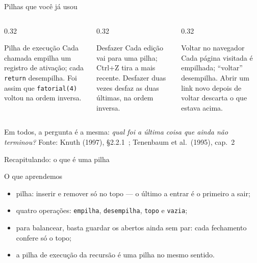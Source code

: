 \documentclass[aspectratio=169]{beamer}
\newcommand{\fonte}[1]{\vfill\hfill{\scriptsize\textcolor{UFSGray}{Fonte: #1}}}
\begin{document}
\begin{frame}{Pilhas que você já usou}
  \begin{columns}[T]
    \begin{column}{0.32\textwidth}
      \begin{block}{Pilha de execução}
        \small Cada chamada empilha um registro de ativação; cada
        \texttt{return} desempilha. Foi assim que \texttt{fatorial(4)}
        voltou na ordem inversa.
      \end{block}
    \end{column}
    \begin{column}{0.32\textwidth}
      \begin{block}{Desfazer}
        \small Cada edição vai para uma pilha; \textsf{Ctrl+Z} tira a mais
        recente. Desfazer duas vezes desfaz as duas últimas, na ordem
        inversa.
      \end{block}
    \end{column}
    \begin{column}{0.32\textwidth}
      \begin{block}{Voltar no navegador}
        \small Cada página visitada é empilhada; ``voltar'' desempilha.
        Abrir um link novo depois de voltar descarta o que estava acima.
      \end{block}
    \end{column}
  \end{columns}
  \medskip
  \small Em todos, a pergunta é a mesma: \emph{qual foi a última coisa que
  ainda não terminou?}
  \fonte{Knuth (1997), §2.2.1~\cite{knuth1997art};
    Tenenbaum et al.\ (1995), cap.~2~\cite{tenenbaum1995estruturas}}
\end{frame}

\begin{frame}{Recapitulando: o que é uma pilha}
  \begin{block}{O que aprendemos}
    \begin{itemize}
      \item pilha: inserir e remover só no topo --- o último a entrar é o
        primeiro a sair;
      \item quatro operações: \texttt{empilha}, \texttt{desempilha},
        \texttt{topo} e \texttt{vazia};
      \item para balancear, basta guardar os abertos ainda sem par: cada
        fechamento confere só o topo;
      \item a pilha de execução da recursão é uma pilha no mesmo sentido.
    \end{itemize}
  \end{block}
\end{frame}
\end{document}
